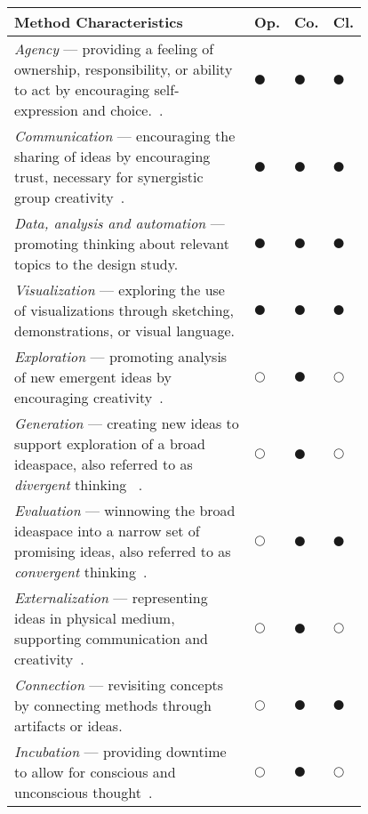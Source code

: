 \begin{table}
    \small
    \centering
    \begin{tabular}{|m{0.7\linewidth}|m{0.03\linewidth}|m{0.03\linewidth}|m{0.03\linewidth}|}
        \hline
        \textbf{Method Characteristics} & \textbf{Op.} & \textbf{Co.} & \textbf{Cl.} \\
        \hline
        \emph{Agency} --- providing a feeling of ownership, responsibility, or ability to act by encouraging self-expression and choice.~\cite{Brooks-Harris1999}. & $\CIRCLE$ & $\CIRCLE$ & $\CIRCLE$ \\
        \hline
        \emph{Communication} --- encouraging the sharing of ideas by encouraging trust, necessary for synergistic group creativity~\cite{Sawyer2003}. & $\CIRCLE$ & $\CIRCLE$ & $\CIRCLE$ \\
        \hline
        \emph{Data, analysis and automation} --- promoting thinking about relevant topics to the design study. & $\CIRCLE$ & $\CIRCLE$ & $\CIRCLE$ \\
        \hline
        \emph{Visualization} --- exploring the use of visualizations through sketching, demonstrations, or visual language.  & $\CIRCLE$ & $\CIRCLE$ & $\CIRCLE$ \\
        \hline
        \emph{Exploration} --- promoting analysis of new emergent ideas by encouraging creativity~\cite{Nickerson1999}. & $\Circle$ & $\CIRCLE$ & $\Circle$ \\
        \hline
        \emph{Generation} --- creating new ideas to support exploration of a broad ideaspace, also referred to as \emph{divergent} thinking ~\cite{Osborn1953}. & $\Circle$ & $\CIRCLE$ & $\Circle$\\
        \hline
        \emph{Evaluation} --- winnowing the broad ideaspace into a narrow set of promising ideas, also referred to as \emph{convergent} thinking~\cite{Osborn1953}. & $\Circle$ & $\CIRCLE$ & $\CIRCLE$ \\
        \hline
        \emph{Externalization} --- representing ideas in physical medium, supporting communication and creativity~\cite{Sawyer2006}. & $\Circle$ & $\CIRCLE$ & $\Circle$ \\
        \hline 
        \emph{Connection} --- revisiting concepts by connecting methods through artifacts or ideas. & $\Circle$ & $\CIRCLE$ & $\CIRCLE$ \\
        \hline
        \emph{Incubation} --- providing downtime to allow for conscious and unconscious thought~\cite{Sawyer2006}. & $\Circle$ & $\CIRCLE$ & $\Circle$\\

\end{tabular}
\end{table}
